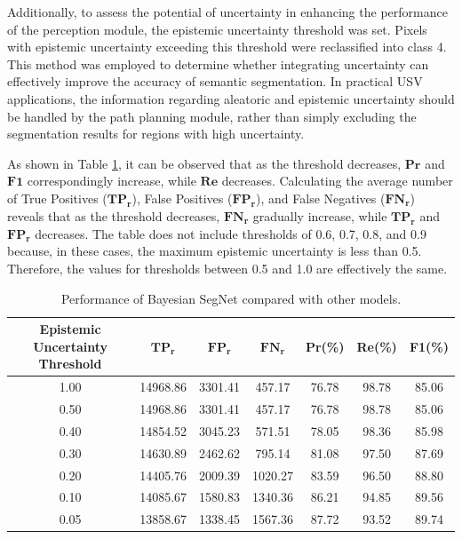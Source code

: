 Additionally, to assess the potential of uncertainty in enhancing the performance of the perception module, the 
epistemic uncertainty threshold was set. Pixels with epistemic uncertainty exceeding this threshold were 
reclassified into class 4. This method was employed to determine whether integrating uncertainty can effectively 
improve the accuracy of semantic segmentation. In practical USV applications, the information regarding aleatoric 
and epistemic uncertainty should be handled by the path planning module, rather than simply excluding the 
segmentation results for regions with high uncertainty. 

As shown in Table \ref{tab:uncertainty-threshold}, it can be observed that as the threshold decreases, $\mathbf{Pr}$ 
and $\mathbf{F1}$ correspondingly increase, while $\mathbf{Re}$ decreases. Calculating the average number of True 
Positives ($\mathbf{TP_r}$), False Positives ($\mathbf{FP_r}$), and False Negatives ($\mathbf{FN_r}$)  reveals that 
as the threshold decreases, $\mathbf{FN_r}$ gradually increase, while $\mathbf{TP_r}$ and $\mathbf{FP_r}$ decreases. 
The table does not include thresholds of 0.6, 0.7, 0.8, and 0.9 because, in these cases, the maximum epistemic 
uncertainty is less than 0.5. Therefore, the values for thresholds between 0.5 and 1.0 are effectively the same.
\begin{table}[ht!]
    \centering
    \caption{Performance of Bayesian SegNet compared with other models.}
    \label{tab:uncertainty-threshold}
    \begin{tabular}{c|c|c|c|c|c|c}
    \textbf{Epistemic Uncertainty Threshold} & $\mathbf{TP_r}$ &$\mathbf{FP_r}$ & $\mathbf{FN_r}$ & \textbf{Pr}(\%) & \textbf{Re}(\%) & \textbf{F1}(\%) \\ \hline
    1.00 & 14968.86 & 3301.41 & 457.17 & 76.78 & 98.78 & 85.06 \\ \hline 
    0.50 & 14968.86 & 3301.41 & 457.17 & 76.78 & 98.78 & 85.06 \\ \hline 
    0.40 & 14854.52 & 3045.23 & 571.51 & 78.05 & 98.36 & 85.98 \\ \hline
    0.30 & 14630.89 & 2462.62 & 795.14 & 81.08 & 97.50 & 87.69 \\ \hline
    0.20 & 14405.76 & 2009.39 & 1020.27 & 83.59 & 96.50 & 88.80 \\ \hline
    0.10 & 14085.67 & 1580.83 & 1340.36 & 86.21 & 94.85 & 89.56 \\ \hline 
    0.05 & 13858.67 & 1338.45 & 1567.36 & 87.72 & 93.52 & 89.74 \\ \hline 
    \end{tabular}
\end{table}

